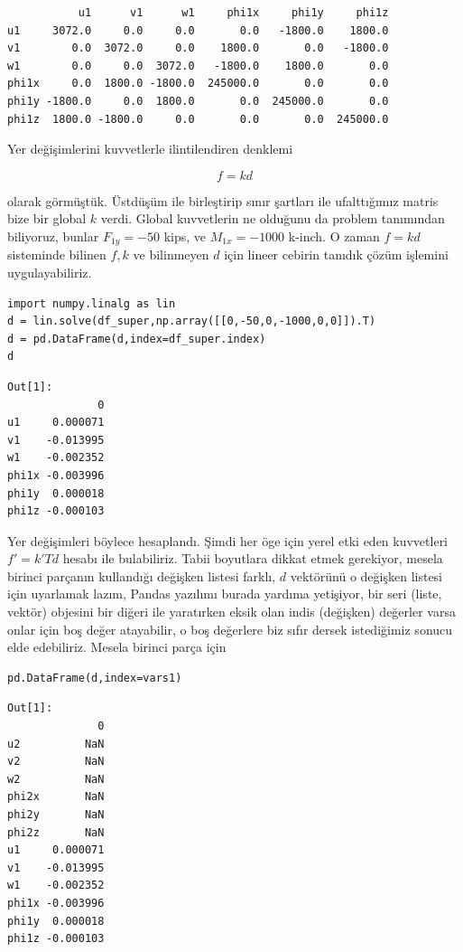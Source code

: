 \documentclass[12pt,fleqn]{article}\usepackage{../../common}
\begin{document}
\begin{verbatim}
           u1      v1      w1     phi1x     phi1y     phi1z
u1     3072.0     0.0     0.0       0.0   -1800.0    1800.0
v1        0.0  3072.0     0.0    1800.0       0.0   -1800.0
w1        0.0     0.0  3072.0   -1800.0    1800.0       0.0
phi1x     0.0  1800.0 -1800.0  245000.0       0.0       0.0
phi1y -1800.0     0.0  1800.0       0.0  245000.0       0.0
phi1z  1800.0 -1800.0     0.0       0.0       0.0  245000.0
\end{verbatim}

Yer değişimlerini kuvvetlerle ilintilendiren denklemi

$$
f = k d
$$

olarak görmüştük. Üstdüşüm ile birleştirip sınır şartları ile ufalttığımız
matris bize bir global $k$ verdi. Global kuvvetlerin ne olduğunu da problem
tanımından biliyoruz, bunlar $F_{1y} = -50$ kips, ve $M_{1x} = -1000$ k-inch.  O
zaman $f = kd$ sisteminde bilinen $f,k$ ve bilinmeyen $d$ için lineer cebirin
tanıdık çözüm işlemini uygulayabiliriz.

\begin{verbatim}
import numpy.linalg as lin
d = lin.solve(df_super,np.array([[0,-50,0,-1000,0,0]]).T)
d = pd.DataFrame(d,index=df_super.index)
d
\end{verbatim}

\begin{verbatim}
Out[1]: 
              0
u1     0.000071
v1    -0.013995
w1    -0.002352
phi1x -0.003996
phi1y  0.000018
phi1z -0.000103
\end{verbatim}

Yer değişimleri böylece hesaplandı. Şimdi her öge için yerel etki eden
kuvvetleri $f' = k' T d$ hesabı ile bulabiliriz. Tabii boyutlara dikkat etmek
gerekiyor, mesela birinci parçanın kullandığı değişken listesi farklı, $d$
vektörünü o değişken listesi için uyarlamak lazım, Pandas yazılımı burada
yardıma yetişiyor, bir seri (liste, vektör) objesini bir diğeri ile yaratırken
eksik olan indis (değişken) değerler varsa onlar için boş değer atayabilir, o
boş değerlere biz sıfır dersek istediğimiz sonucu elde edebiliriz. Mesela
birinci parça için

\begin{verbatim}
pd.DataFrame(d,index=vars1)
\end{verbatim}

\begin{verbatim}
Out[1]: 
              0
u2          NaN
v2          NaN
w2          NaN
phi2x       NaN
phi2y       NaN
phi2z       NaN
u1     0.000071
v1    -0.013995
w1    -0.002352
phi1x -0.003996
phi1y  0.000018
phi1z -0.000103
\end{verbatim}
\end{document}
